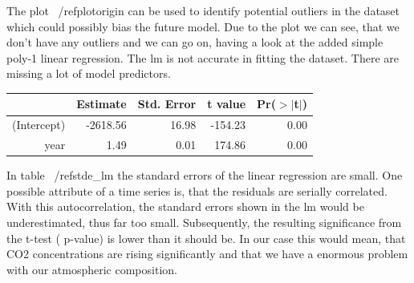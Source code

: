 \documentclass[11pt, a4paper]{article} %
\begin{document}
The plot ~/ref{plotorigin} can be used to identify potential outliers in the dataset which could possibly bias the future model.  Due to the plot we can see, that we don't have any outliers and we can go on, having a look at the added simple poly-1 linear regression. The lm is not accurate in fitting the dataset. There are missing a lot of model predictors.

\begin{Schunk}
\begin{table}[ht]
\centering
\begin{tabular}{rrrrr}
  \hline
 & Estimate & Std. Error & t value & Pr($>$$|$t$|$) \\ 
  \hline
(Intercept) & -2618.56 & 16.98 & -154.23 & 0.00 \\ 
  year & 1.49 & 0.01 & 174.86 & 0.00 \\ 
   \hline
\end{tabular}
\end{table}\end{Schunk}
In table ~/ref{stde_lm}  the standard errors of the linear regression are small.  One possible attribute of a time series is, that the residuals are serially correlated. With this autocorrelation, the standard errors shown in the lm would be underestimated, thus far too small.  Subsequently, the resulting significance  from the t-test ( p-value) is lower than it should be. In our case this would mean, that CO2 concentrations are rising significantly and that we have a enormous problem with our atmospheric composition. 
\end{document}
